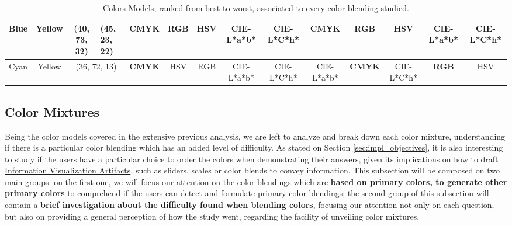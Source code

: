 \begin{table}[htbp]
{\begin{tabular}{@{}cccccccccccccc@{}}
    Blue    & \multicolumn{1}{c|}{Yellow}  & \multicolumn{1}{c|}{\cellcolor[HTML]{00FF80}(40, 73, 32)} & \multicolumn{1}{l|}{\cellcolor[HTML]{FF007F}(45, 23, 22)} & \multicolumn{1}{c|}{\textbf{CMYK}} & \multicolumn{1}{c|}{RGB}           & \multicolumn{1}{c|}{HSV}        & \multicolumn{1}{c|}{CIE-L*a*b*} & \multicolumn{1}{c|}{CIE-L*C*h*} & \multicolumn{1}{c|}{\textbf{CMYK}} & \multicolumn{1}{c|}{\textbf{RGB}}  & \multicolumn{1}{c|}{HSV}           & \multicolumn{1}{c|}{CIE-L*a*b*}    & \multicolumn{1}{c|}{CIE-L*C*h*}    \\ \midrule
    Cyan    & \multicolumn{1}{c|}{Yellow}  & \multicolumn{2}{c|}{\cellcolor[HTML]{00FF00}(36, 72, 13)}                                                             & \multicolumn{1}{c|}{\textbf{CMYK}} & \multicolumn{1}{c|}{HSV}           & \multicolumn{1}{c|}{RGB}        & \multicolumn{1}{c|}{CIE-L*a*b*} & \multicolumn{1}{c|}{CIE-L*C*h*} & \multicolumn{1}{c|}{CIE-L*a*b*}    & \multicolumn{1}{c|}{\textbf{CMYK}} & \multicolumn{1}{c|}{CIE-L*C*h*}    & \multicolumn{1}{c|}{\textbf{RGB}}  & \multicolumn{1}{c|}{HSV}           \\ \bottomrule
  \end{tabular}}
  \caption[Colors Models, ranked from best to worst, associated to every color blending studied.]{Colors Models, ranked from best to worst, associated to every color blending studied.}
  \label{table:blendings_models_rank}
\end{table}
%
\subsection{Color Mixtures}
\label{subsec:results_colormixtures}
%
Being the color models covered in the extensive previous analysis, we are left to analyze and break down each color mixture, understanding if there is a particular color blending which has an added level of
difficulty. As stated on Section \ref{sec:impl_objectives}, it is also interesting to study if the users have a particular choice to order the colors when demonstrating their answers, given its implications on how to draft \ul{Information Visualization Artifacts},
such as sliders, scales or color blends to convey information.
%
This subsection will be composed on two main groups: on the first one, we will focus our attention on the color blendings which are \textbf{based on primary colors, to generate other primary colors} to comprehend
if the users can detect and formulate primary color blendings; the second group of this subsection will contain a \textbf{brief investigation about the difficulty found when blending colors}, focusing our attention
not only on each question, but also on providing a general perception of how the study went, regarding the facility of unveiling color mixtures.
%
